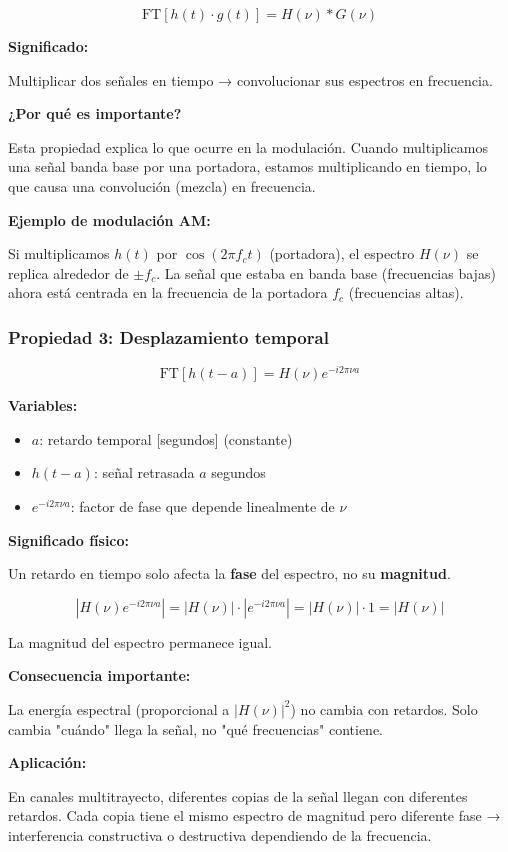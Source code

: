 \documentclass[11pt,a4paper]{article}
\begin{document}
\begin{tcolorbox}[colback=rojoclaro!20,colframe=azuloscuro,title=\textbf{Producto $\leftrightarrow$ Convolución}]
$$\boxed{\text{FT}[h(t) \cdot g(t)] = H(\nu) * G(\nu)}$$

\textbf{Significado:}

Multiplicar dos señales en tiempo → convolucionar sus espectros en frecuencia.

\textbf{¿Por qué es importante?}

Esta propiedad explica lo que ocurre en la modulación. Cuando multiplicamos una señal banda base por una portadora, estamos multiplicando en tiempo, lo que causa una convolución (mezcla) en frecuencia.

\textbf{Ejemplo de modulación AM:}

Si multiplicamos $h(t)$ por $\cos(2\pi f_c t)$ (portadora), el espectro $H(\nu)$ se replica alrededor de $\pm f_c$. La señal que estaba en banda base (frecuencias bajas) ahora está centrada en la frecuencia de la portadora $f_c$ (frecuencias altas).
\end{tcolorbox}

\subsubsection{Propiedad 3: Desplazamiento temporal}

\begin{tcolorbox}[colback=rojoclaro!20,colframe=azuloscuro,title=\textbf{Retardo en tiempo}]
$$\boxed{\text{FT}[h(t-a)] = H(\nu)e^{-i2\pi\nu a}}$$

\textbf{Variables:}
\begin{itemize}
\item $a$: retardo temporal [segundos] (constante)
\item $h(t-a)$: señal retrasada $a$ segundos
\item $e^{-i2\pi\nu a}$: factor de fase que depende linealmente de $\nu$
\end{itemize}

\textbf{Significado físico:}

Un retardo en tiempo solo afecta la \textbf{fase} del espectro, no su \textbf{magnitud}.

$$|H(\nu)e^{-i2\pi\nu a}| = |H(\nu)| \cdot |e^{-i2\pi\nu a}| = |H(\nu)| \cdot 1 = |H(\nu)|$$

La magnitud del espectro permanece igual.

\textbf{Consecuencia importante:}

La energía espectral (proporcional a $|H(\nu)|^2$) no cambia con retardos. Solo cambia "cuándo" llega la señal, no "qué frecuencias" contiene.

\textbf{Aplicación:}

En canales multitrayecto, diferentes copias de la señal llegan con diferentes retardos. Cada copia tiene el mismo espectro de magnitud pero diferente fase → interferencia constructiva o destructiva dependiendo de la frecuencia.
\end{tcolorbox}
\end{document}

